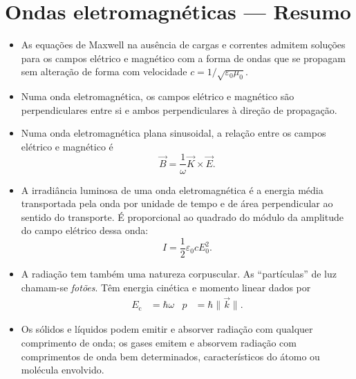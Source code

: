 \section*{Ondas eletromagnéticas --- Resumo}
\begin{itemize}
\item
    As equações de Maxwell na ausência de cargas e correntes admitem soluções
    para os campos elétrico e magnético com a forma de ondas que se propagam sem
    alteração de forma com velocidade $c=1/\sqrt{\varepsilon_0\mu_0}$.
\item
    Numa onda eletromagnética, os campos elétrico e magnético são
    perpendiculares entre si e ambos perpendiculares à direção de propagação.
\item
    Numa onda eletromagnética plana sinusoidal, a relação entre os campos
    elétrico e magnético é
    \begin{equation*}
    \vec B=\frac{1}{\omega}\vec K\times\vec E.
    \end{equation*}
\item
    A irradiância luminosa de uma onda eletromagnética é a energia média
    transportada pela onda por unidade de tempo e de área perpendicular ao
    sentido do transporte. É proporcional ao quadrado do módulo da amplitude do
    campo elétrico dessa onda:
    \begin{equation*}
    I=\frac{1}{2}\varepsilon_0cE_0^2.
    \end{equation*}
\item
    A radiação tem também uma natureza corpuscular. As ``partículas'' de luz
    chamam-se \emph{fotões}. Têm energia cinética e momento linear dados por
    \begin{align*}
    E_\text{c}&=\hbar\omega&p&=\hbar\|\vec k\|.
    \end{align*}
\item
    Os sólidos e líquidos podem emitir e absorver radiação com qualquer
    comprimento de onda; os gases emitem e absorvem radiação com comprimentos de
    onda bem determinados, característicos do átomo ou molécula envolvido.
\end{itemize}
